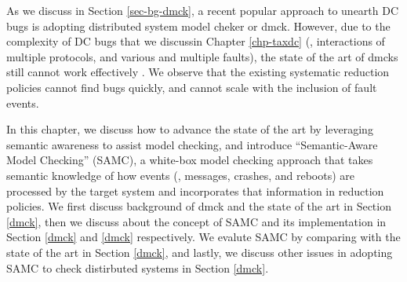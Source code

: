 
As we discuss in Section \ref{sec-bg-dmck}, a recent popular approach to unearth
DC bugs is adopting distributed system model cheker or dmck. However, due to the
complexity of DC bugs that we discussin Chapter \ref{chp-taxdc} (\eg,
interactions of multiple protocols, and various and multiple faults), the state
of the art of dmcks still cannot work effectively . We observe that the existing systematic reduction policies
cannot find bugs quickly, and cannot scale with the inclusion of fault events.

In this chapter, we discuss how to advance the state of the art by leveraging
semantic awareness to assist model checking, and introduce ``Semantic-Aware
Model Checking'' (SAMC), a white-box model checking approach that takes semantic
knowledge of how events (\eg, messages, crashes, and reboots) are processed by
the target system and incorporates that information in reduction policies. We
first discuss background of dmck and the state of the art in Section \ref{dmck},
then we discuss about the concept of SAMC and its implementation in Section
\ref{dmck} and \ref{dmck} respectively. We evalute SAMC by comparing with the
state of the art in Section \ref{dmck}, and lastly, we discuss other issues in
adopting SAMC to check distirbuted systems in Section \ref{dmck}.


